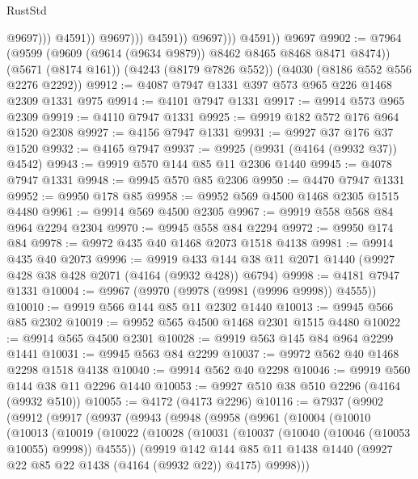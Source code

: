 \begin{lexlean}{RustStd}
\begin{coremodule}
                                  @9697)))
                            @4591))
                        @9697)))
                  @4591))
              @9697)))
        @4591))
    @9697
@9902 := @7964
    (@9599 (@9609 (@9614 (@9634 @9879)) @8462 @8465 @8468 @8471 @8474))
    (@5671 (@8174 @161))
    (@4243 (@8179 @7826 @552))
    (@4030 (@8186 @552 @556 @2276 @2292))
@9912 := @4087 @7947 @1331 @397 @573 @965 @226 @1468 @2309 @1331 @975
@9914 := @4101 @7947 @1331
@9917 := @9914 @573 @965 @2309
@9919 := @4110 @7947 @1331
@9925 := @9919 @182 @572 @176 @964 @1520 @2308
@9927 := @4156 @7947 @1331
@9931 := @9927 @37 @176 @37 @1520
@9932 := @4165 @7947
@9937 := @9925 (@9931 (@4164 (@9932 @37)) @4542)
@9943 := @9919 @570 @144 @85 @11 @2306 @1440
@9945 := @4078 @7947 @1331
@9948 := @9945 @570 @85 @2306
@9950 := @4470 @7947 @1331
@9952 := @9950 @178 @85
@9958 := @9952 @569 @4500 @1468 @2305 @1515 @4480
@9961 := @9914 @569 @4500 @2305
@9967 := @9919 @558 @568 @84 @964 @2294 @2304
@9970 := @9945 @558 @84 @2294
@9972 := @9950 @174 @84
@9978 := @9972 @435 @40 @1468 @2073 @1518 @4138
@9981 := @9914 @435 @40 @2073
@9996 := @9919 @433 @144 @38 @11 @2071 @1440 (@9927 @428 @38 @428 @2071 (@4164 (@9932 @428)) @6794)
@9998 := @4181 @7947 @1331
@10004 := @9967 (@9970 (@9978 (@9981 (@9996 @9998)) @4555))
@10010 := @9919 @566 @144 @85 @11 @2302 @1440
@10013 := @9945 @566 @85 @2302
@10019 := @9952 @565 @4500 @1468 @2301 @1515 @4480
@10022 := @9914 @565 @4500 @2301
@10028 := @9919 @563 @145 @84 @964 @2299 @1441
@10031 := @9945 @563 @84 @2299
@10037 := @9972 @562 @40 @1468 @2298 @1518 @4138
@10040 := @9914 @562 @40 @2298
@10046 := @9919 @560 @144 @38 @11 @2296 @1440
@10053 := @9927 @510 @38 @510 @2296 (@4164 (@9932 @510))
@10055 := @4172 (@4173 @2296)
@10116 := @7937
    (@9902
      (@9912
        (@9917
          (@9937
            (@9943
              (@9948
                (@9958
                  (@9961
                    (@10004
                      (@10010
                        (@10013
                          (@10019
                            (@10022
                              (@10028
                                (@10031 (@10037 (@10040 (@10046 (@10053 @10055) @9998)) @4555))
                                (@9919
                                  @142
                                  @144
                                  @85
                                  @11
                                  @1438
                                  @1440
                                  (@9927 @22 @85 @22 @1438 (@4164 (@9932 @22)) @4175)
                                  @9998)))

\end{coremodule}
\end{lexlean}
